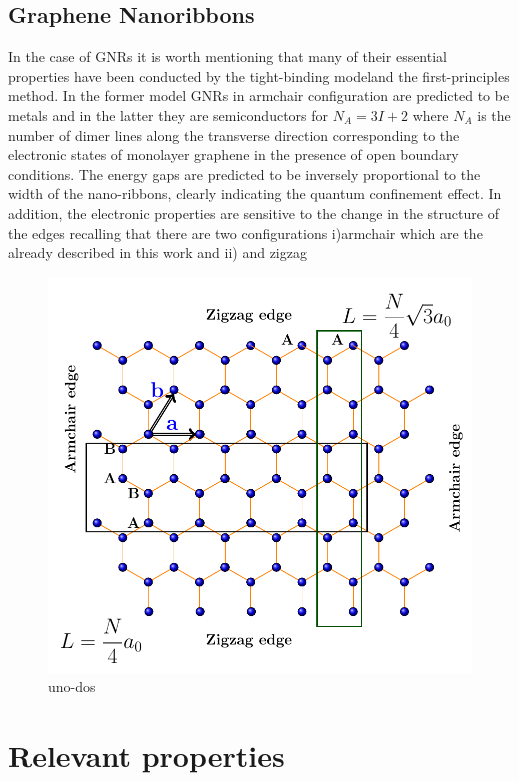 \subsection{Graphene Nanoribbons}
\vspace{-1cm}
In the case of GNRs it is worth mentioning that many of their essential properties have been conducted by the tight-binding model\cite{nakada1996edge,sohmen1992electronic}and the first-principles method\cite{son2006half}. In the former model GNRs in armchair configuration are predicted to be metals and in the latter they are semiconductors for $N_A=3I+2$ where $N_A$ is the number of dimer lines along the transverse direction corresponding to the electronic states of monolayer graphene in the presence of open boundary conditions. The energy gaps are predicted to be inversely proportional to the width of the nano-ribbons, clearly indicating the quantum confinement effect. In addition, the electronic properties are sensitive to the change in the structure of the edges recalling that there are two configurations i)armchair which are the already described in this work and ii) and zigzag\cite{lin2018structure}
\begin{figure}[H]
	\centering
	\includegraphics[width=0.75\linewidth]{FIGURES/Physical_Background/Graphene_States.pdf}
	\caption{uno-dos}
	\label{fig:sq-how to reflex}
\end{figure}


\section{Relevant properties}


